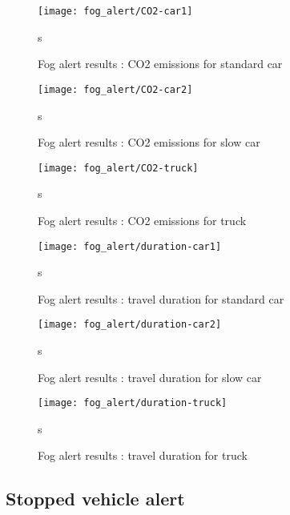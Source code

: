 \documentclass[a4paper,10pt]{report}
\begin{document}
\begin{figure}
    \begin{center}
         \texttt{[image: fog\_alert/CO2-car1]}
    \end{center}s
  \caption{ Fog alert results : CO2 emissions for standard car}
  \label{fig:ttc_part}
\end{figure}


\begin{figure}
    \begin{center}
         \texttt{[image: fog\_alert/CO2-car2]}
    \end{center}s
  \caption{ Fog alert results : CO2 emissions for slow car}
  \label{fig:ttc_part}
\end{figure}


\begin{figure}
    \begin{center}
         \texttt{[image: fog\_alert/CO2-truck]}
    \end{center}s
  \caption{ Fog alert results : CO2 emissions for truck}
  \label{fig:ttc_part}
\end{figure}

\begin{figure}
    \begin{center}
         \texttt{[image: fog\_alert/duration-car1]}
    \end{center}s
  \caption{ Fog alert results : travel duration for standard car}
  \label{fig:ttc_part}
\end{figure}


\begin{figure}
    \begin{center}
         \texttt{[image: fog\_alert/duration-car2]}
    \end{center}s
  \caption{ Fog alert results : travel duration for slow car}
  \label{fig:ttc_part}
\end{figure}


\begin{figure}
    \begin{center}
         \texttt{[image: fog\_alert/duration-truck]}
    \end{center}s
  \caption{ Fog alert results : travel duration for truck}
  \label{fig:ttc_part}
\end{figure}



\subsection{Stopped vehicle alert}
\end{document}
